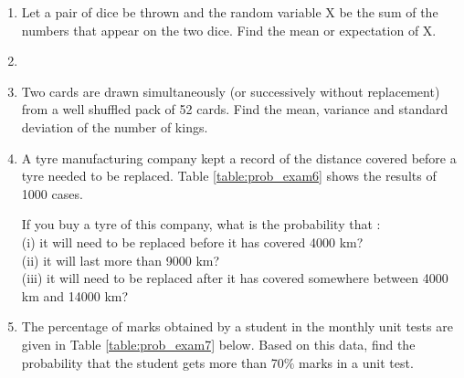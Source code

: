\begin{enumerate}[label=\thesection.\arabic*.,ref=\thesection.\theenumi]
\item Let a pair of dice be thrown and the random variable X be the sum of the numbers that appear on the two dice. Find the mean or expectation of X.\\

\item

\item Two cards are drawn simultaneously (or successively without replacement) from a well shuffled pack of 52 cards. Find the mean, variance and standard deviation of the number of kings.\\
\solution

\item A tyre manufacturing company kept a record of the distance covered
before a tyre needed to be replaced. Table \ref{table:prob_exam6}
shows the results of 1000 cases.
\begin{table}[!ht]
\centering
{}
\caption{}
\label{table:prob_exam6}
\end{table}
If you buy a tyre of this company, what is the probability that :\\
(i) it will need to be replaced before it has covered 4000 km?\\
(ii) it will last more than 9000 km?\\
(iii) it will need to be replaced after it has covered somewhere between 4000 km and 14000 km?\\
\solution


\item The percentage of marks obtained by a student in the monthly unit tests are given in Table \ref{table:prob_exam7}
below.
Based on this data, find the probability that the student gets more than 70$\%$ marks in a unit test.\\


\end{enumerate}
